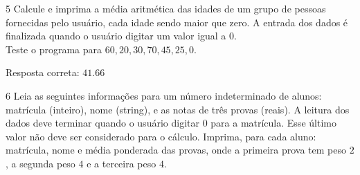 \begin{exercicio}
  {5}
  {Calcule e imprima a média aritmética das idades de um grupo de pessoas fornecidas pelo usuário, cada idade sendo maior que zero. A entrada dos dados é finalizada quando o usuário digitar um valor igual a $0$. \\
  Teste o programa para $60,20,30,70,45,25,0$.}

  Resposta correta: $41.66$
\end{exercicio}

\begin{exercicio}
  {6}
  {Leia as seguintes informações para um número indeterminado de alunos: matrícula (inteiro), nome (string), e as notas de três provas (reais). A leitura dos dados deve terminar quando o usuário digitar $0$ para a matrícula. Esse último valor não deve ser considerado para o cálculo. Imprima, para cada aluno: matrícula, nome e média ponderada das provas, onde a primeira prova tem peso $2$, a segunda peso $4$ e a terceira peso $4$.}
\end{exercicio}